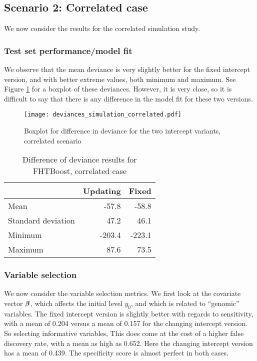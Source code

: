 \subsection{Scenario 2: Correlated case}
We now consider the results for the correlated simulation study.

\subsubsection{Test set performance/model fit}
We observe that the mean deviance is very slightly better for the fixed intercept version, and with better extreme values, both minimum and maximum.
See Figure \ref{fig:simulation-correlated-deviances-boxplot} for a boxplot of these deviances.
However, it is very close, so it is difficult to say that there is any difference in the model fit for these two versions.

\begin{figure}
\caption{Boxplot for difference in deviance for the two intercept variants, correlated scenario}
\label{fig:simulation-correlated-deviances-boxplot}
\centering\texttt{[image: deviances\_simulation\_correlated.pdf]}
\end{figure}


\begin{table}
\caption{Difference of deviance results for FHTBoost, correlated case}
\label{table:uncorrelated-deviance}
\centering
\begin{tabular}{l|rr}
\toprule
& Updating & Fixed \\
\hline
Mean               &  -57.8  &  -58.8  \\
Standard deviation &   47.2  &   46.1  \\
Minimum            & -203.4  & -223.1  \\
Maximum            &   87.6  &   73.5  \\
\bottomrule
\end{tabular}
\end{table}


\subsubsection{Variable selection}
We now consider the variable selection metrics.
We first look at the covariate vector $\boldsymbol{\beta}$, which affects the initial level $y_0$, and which is related to ``genomic'' variables.
The fixed intercept version is slightly better with regards to sensitivity, with a mean of 0.204 versus a mean of 0.157 for the changing intercept version.
So selecting informative variables,
This does come at the cost of a higher false discovery rate, with a mean as high as 0.652.
Here the changing intercept version has a mean of 0.439.
The specificity score is almost perfect in both cases.

